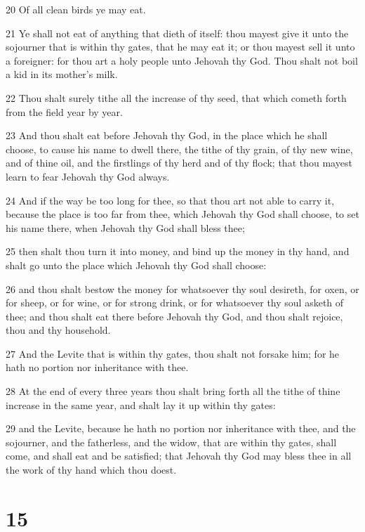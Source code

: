 \par 20 Of all clean birds ye may eat.
\par 21 Ye shall not eat of anything that dieth of itself: thou mayest give it unto the sojourner that is within thy gates, that he may eat it; or thou mayest sell it unto a foreigner: for thou art a holy people unto Jehovah thy God. Thou shalt not boil a kid in its mother's milk.
\par 22 Thou shalt surely tithe all the increase of thy seed, that which cometh forth from the field year by year.
\par 23 And thou shalt eat before Jehovah thy God, in the place which he shall choose, to cause his name to dwell there, the tithe of thy grain, of thy new wine, and of thine oil, and the firstlings of thy herd and of thy flock; that thou mayest learn to fear Jehovah thy God always.
\par 24 And if the way be too long for thee, so that thou art not able to carry it, because the place is too far from thee, which Jehovah thy God shall choose, to set his name there, when Jehovah thy God shall bless thee;
\par 25 then shalt thou turn it into money, and bind up the money in thy hand, and shalt go unto the place which Jehovah thy God shall choose:
\par 26 and thou shalt bestow the money for whatsoever thy soul desireth, for oxen, or for sheep, or for wine, or for strong drink, or for whatsoever thy soul asketh of thee; and thou shalt eat there before Jehovah thy God, and thou shalt rejoice, thou and thy household.
\par 27 And the Levite that is within thy gates, thou shalt not forsake him; for he hath no portion nor inheritance with thee.
\par 28 At the end of every three years thou shalt bring forth all the tithe of thine increase in the same year, and shalt lay it up within thy gates:
\par 29 and the Levite, because he hath no portion nor inheritance with thee, and the sojourner, and the fatherless, and the widow, that are within thy gates, shall come, and shall eat and be satisfied; that Jehovah thy God may bless thee in all the work of thy hand which thou doest.

\chapter{15}

